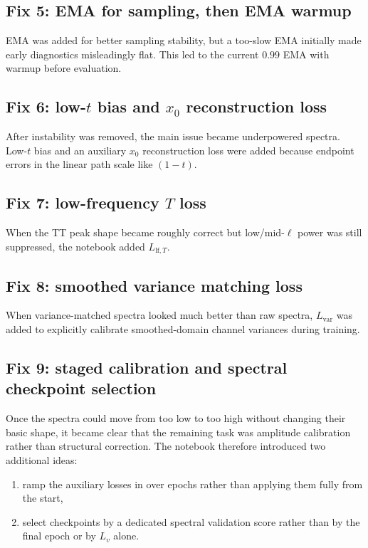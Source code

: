 \documentclass[11pt]{article}
\begin{document}
\subsection{Fix 5: EMA for sampling, then EMA warmup}

EMA was added for better sampling stability, but a too-slow EMA initially made early diagnostics misleadingly flat. This led to the current \(0.99\) EMA with warmup before evaluation.

\subsection{Fix 6: low-\(t\) bias and \(x_0\) reconstruction loss}

After instability was removed, the main issue became underpowered spectra. Low-\(t\) bias and an auxiliary \(x_0\) reconstruction loss were added because endpoint errors in the linear path scale like \((1-t)\).

\subsection{Fix 7: low-frequency \(T\) loss}

When the TT peak shape became roughly correct but low/mid-\(\ell\) power was still suppressed, the notebook added \(L_{\mathrm{lf},T}\).

\subsection{Fix 8: smoothed variance matching loss}

When variance-matched spectra looked much better than raw spectra, \(L_{\mathrm{var}}\) was added to explicitly calibrate smoothed-domain channel variances during training.

\subsection{Fix 9: staged calibration and spectral checkpoint selection}

Once the spectra could move from too low to too high without changing their basic shape, it became clear that the remaining task was amplitude calibration rather than structural correction. The notebook therefore introduced two additional ideas:
\begin{enumerate}[leftmargin=1.5em]
  \item ramp the auxiliary losses in over epochs rather than applying them fully from the start,
  \item select checkpoints by a dedicated spectral validation score rather than by the final epoch or by \(L_v\) alone.
\end{enumerate}
\end{document}
